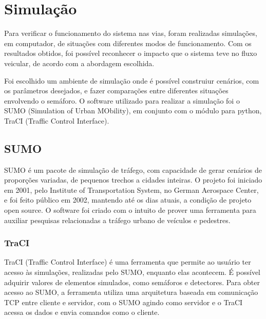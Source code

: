 \chapter{Simulação}

Para verificar o funcionamento do sistema nas vias, foram realizadas simulações, em computador, de situações com diferentes modos de funcionamento. Com os resultados obtidos, foi possível reconhecer o impacto que o sistema teve no fluxo veicular, de acordo com a abordagem escolhida.

Foi escolhido um ambiente de simulação onde é possível construiur cenários, com os parâmetros desejados, e fazer comparações entre diferentes situações envolvendo o semáforo.
O software utilizado para realizar a simulação foi o SUMO (Simulation of Urban MObility), em conjunto com o módulo para python, TraCI (Traffic Control Interface).

\section{SUMO}
SUMO é um pacote de simulação de tráfego, com capacidade de gerar cenários de proporções variadas, de pequenos trechos a cidades inteiras. O projeto foi iniciado em 2001, pelo Institute of Transportation System, no German Aerospace Center, e foi feito público em 2002, mantendo até os dias atuais, a condição de projeto open source.
O software foi criado com o intuito de prover uma ferramenta para auxiliar pesquisas relacionadas a tráfego urbano de veículos e pedestres\cite{sumo}. 
  
\subsection{TraCI}  

TraCI (Traffic Control Interface) é uma ferramenta que permite ao usuário ter acesso às simulações, realizadas pelo SUMO, enquanto elas acontecem. É possível adquirir valores de elementos simulados, como semáforos e detectores.
Para obter acesso ao SUMO, a ferramenta utiliza uma arquitetura baseada em comunicação TCP entre cliente e servidor, com o SUMO agindo como servidor e o TraCI acessa os dados e envia comandos como o cliente\cite{sumo}.

